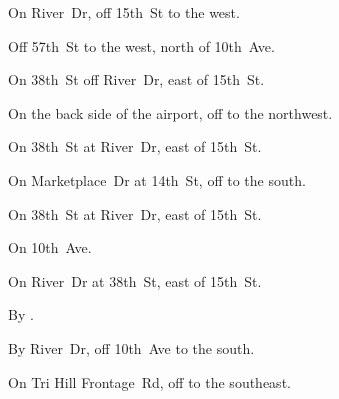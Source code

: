 

\begin{LocationList}

On River~Dr, off  15th~St to the west.

Off 57th~St to the west, north of   10th~Ave.

\Location{\GarageHQ \Garage}
On 38th~St off River~Dr, east of  15th~St.

On the back side of the airport, off   to the northwest.

On 38th~St at River~Dr, east of  15th~St.

On Marketplace~Dr at 14th~St, off   to the south.

\Location{\RecruitmentAgency \Recruitment}
On 38th~St at River~Dr, east of  15th~St.

On   10th~Ave.

On River~Dr at 38th~St, east of  15th~St.

\Location{\TruckStop \Gas \Rest}
By  .

By River~Dr, off  10th~Ave to the south.

On Tri Hill Frontage~Rd, off   to the southeast.

\end{LocationList}
